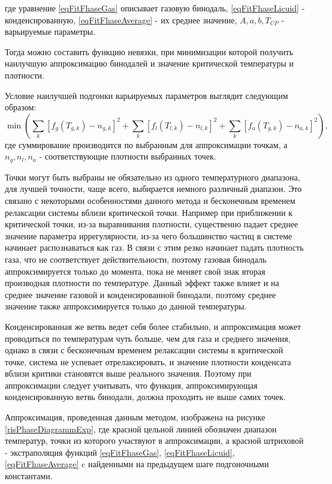 где уравнение \ref{eqFitFhaseGas} описывает газовую бинодаль, \ref{eqFitFhaseLicuid} - конденсированную, \ref{eqFitFhaseAverage} - их среднее значение, $A, a, b, T_{CP}$ - варьируемые параметры. 

Тогда можно составить функцию невязки, при минимизации которой получить наилучшую аппроксимацию бинодалей и значение критической температуры и плотности.

Условие наилучшей подгонки варьируемых параметров выглядит следующим образом:
\begin{equation}
\min \left(\sum\limits_{k} \left[ f_g(T_{g, k}) - n_{g, k}  \right]^2 + \sum\limits_{k} \left[ f_l(T_{l, k}) - n_{l, k}  \right]^2 + \sum\limits_{k} \left[ f_a(T_{g, k}) - n_{a, k}  \right]^2 \right),
\label{eqFitResidual}
\end{equation}
где суммирование производится по выбранным для аппроксимации точкам, а $n_g, n_l, n_a$ - соответствующие плотности выбранных точек. 

Точки могут быть выбраны не обязательно из одного температурного диапазона, для лучшей точности, чаще всего, выбирается немного различный диапазон. Это связано с некоторыми особенностями данного метода и бесконечным временем релаксации системы вблизи критической точки. Например при приближении к критической точки, из-за выравнивания плотности, существенно падает среднее значение параметра иррегулярности, из-за чего большинство частиц в системе начинает распознаваться как газ. В связи с этим резко начинает падать плотность газа, что не соответствует действительности, поэтому газовая бинодаль аппроксимируется только до момента, пока не меняет свой знак вторая производная плотности по температуре. Данный эффект также влияет и на среднее значение газовой и конденсированной бинодали, поэтому среднее значение также аппроксимируется только до данной температуры.

Конденсированная же ветвь ведет себя более стабильно, и аппроксимация может проводиться по температурам чуть больше, чем для газа и среднего значения, однако в связи с бесконечным временем релаксации системы в критической точке, система не успевает отрелаксировать, и значение плотности конденсата вблизи критики становятся выше реального значения. Поэтому при аппроксимации следует учитывать, что функция, аппроксимирующая конденсированную ветвь бинодали, должна проходить не выше самих точек.

Аппроксимация, проведенная данным методом, изображена на рисунке \ref{risPhaseDiagrammExp}, где красной цельной линией обозначен диапазон температур, точки из которого участвуют в аппроксимации, а красной штриховой - экстраполяция функций \ref{eqFitFhaseGas}, \ref{eqFitFhaseLicuid}, \ref{eqFitFhaseAverage} c найденными на предыдущем шаге подгоночными константами.

